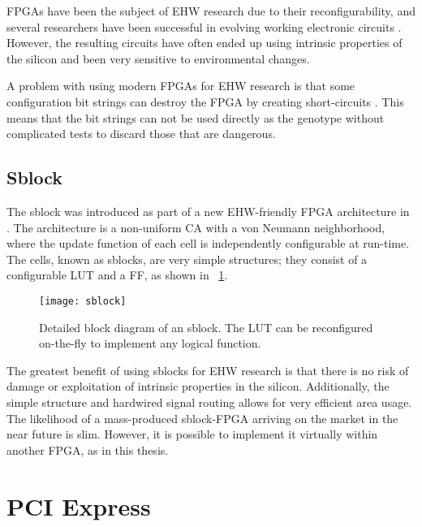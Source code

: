 FPGAs have been the subject of EHW research due to their reconfigurability, and several researchers have been successful in evolving working electronic circuits \cite{huelsbergen1998evolution, thompson1997evolved}.
However, the resulting circuits have often ended up using intrinsic properties of the silicon and been very sensitive to environmental changes.

A problem with using modern FPGAs for EHW research is that some configuration bit strings can destroy the FPGA by creating short-circuits \cite{xapp151, ug380}.
This means that the bit strings can not be used directly as the genotype without complicated tests to discard those that are dangerous.

\subsection{Sblock}
\label{sec:sblock}

The sblock was introduced as part of a new EHW-friendly FPGA architecture in \cite{haddow2000sblock}.
The architecture is a non-uniform CA with a von Neumann neighborhood, where the update function of each cell is independently configurable at run-time.
The cells, known as sblocks, are very simple structures; they consist of a configurable LUT and a FF, as shown in \figurename~\ref{fig:sblock}.

\begin{figure}[!ht]
    \centering
    \texttt{[image: sblock]}
    \caption[Sblock]{
        Detailed block diagram of an sblock.
        The LUT can be reconfigured on-the-fly to implement any logical function.
    }
    \label{fig:sblock}
\end{figure}

The greatest benefit of using sblocks for EHW research is that there is no risk of damage or exploitation of intrinsic properties in the silicon.
Additionally, the simple structure and hardwired signal routing allows for very efficient area usage.
The likelihood of a mass-produced sblock-FPGA arriving on the market in the near future is slim.
However, it is possible to implement it virtually within another FPGA, as in this thesis.


\section{PCI Express}

